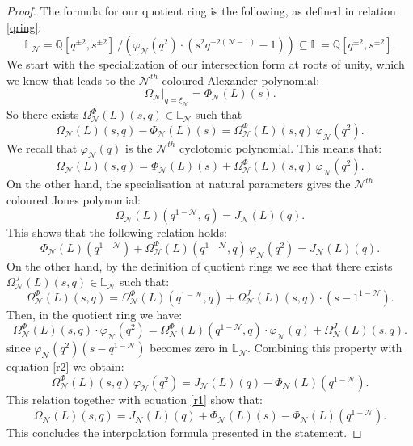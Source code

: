 \documentclass[reqno,a4paper,11pt]{amsart}
\numberwithin{equation}{section}
\numberwithin{figure}{section}
\theoremstyle{definition}
\theoremstyle{plain}
\newcommand{\Q}{\mathbb Q}
\newcommand{\Li}{{\mathbb L}}
\newcommand{\Liq}{\mathbb L}
\newcommand{\cN}{\mathcal{N}}
\begin{document}
\begin{proof}
The formula for our quotient ring is the following, as defined in relation \eqref{qring}:
%
\begin{equation*}
\Li_{\cN}=\Q[q^{\pm2}, s^{\pm 2}] \ / \left(\varphi_\cN(q^2)\cdot (s^2q^{-2(\cN-1)}-1)\right)
\subseteq \Liq=\Q[q^{\pm2}, s^{\pm 2}].
\end{equation*}
%
We start with the specialization of our intersection form at roots of unity, which we know that leads to the $\cN^{th}$ coloured Alexander polynomial:
$$\Omega_{\mathcal{N}}|_{q = \xi_{\mathcal{N}}} = \Phi_{\mathcal{N}}(L)(s).$$
 So there exists $\Omega_{\mathcal{N}}^\Phi(L)(s, q) \in \Li_{\cN}$ such that 
\begin{equation*}
\Omega_{\mathcal{N}}(L)(s, q) - \Phi_{\mathcal{N}}(L)(s) = 
\Omega_{\mathcal{N}}^\Phi(L)(s, q)\, \varphi_{\mathcal{N}}(q^2).
\end{equation*}
We recall that $\varphi_{\mathcal{N}}(q)$ is the $\cN^{th}$ cyclotomic polynomial.
This means that:
\begin{equation}\label{r1}
\Omega_{\mathcal{N}}(L)(s, q)= \Phi_{\mathcal{N}}(L)(s) + 
\Omega_{\mathcal{N}}^\Phi(L)(s,q)\, \varphi_{\mathcal{N}}(q^2).
\end{equation}
On the other hand, the specialisation at natural parameters gives the $\cN^{th}$ coloured Jones polynomial:
$$
\Omega_{\mathcal{N}}(L)(q^{1-\mathcal{N}},\, q) = J_{\mathcal{N}}(L)(q).
$$
This shows that the following relation holds:
\begin{equation}\label{r2}
 \Phi_{\mathcal{N}}(L)(q^{1-\cN}) + 
\Omega_{\mathcal{N}}^\Phi(L)(q^{1-\cN},q)\, \varphi_{\mathcal{N}}(q^2)=J_{\mathcal{N}}(L)(q).
\end{equation}
%
On the other hand, by the definition of quotient rings we see that there exists $\Omega_{\mathcal{N}}^J(L)(s, q) \in \Li_{\cN}$ such that:
\begin{equation*}%
\Omega_{\mathcal{N}}^\Phi(L)(s,q)=\Omega_{\mathcal{N}}^\Phi(L)(q^{1-\cN},q)+\Omega_{\mathcal{N}}^J(L)(s, q) \cdot(s-1^{1-\cN}).
\end{equation*}
Then, in the quotient ring we have:
\begin{equation*}
\Omega_{\mathcal{N}}^\Phi(L)(s,q) \cdot \varphi_{\mathcal{N}}(q^2)=\Omega_{\mathcal{N}}^\Phi(L)(q^{1-\cN},q) \cdot \varphi_{\mathcal{N}}(q)+ \Omega_{\mathcal{N}}^J(L)(s, q).
\end{equation*}
since $\varphi_{\mathcal{N}}(q^2)(s-q^{1-\cN})$ becomes zero in $\Li_{\cN}$.
%
%
Combining this property with equation \eqref{r2} we obtain:
\begin{equation*}
\Omega_{\mathcal{N}}^\Phi(L)(s,q)\, \varphi_{\mathcal{N}}(q^2)=J_{\mathcal{N}}(L)(q)- \Phi_{\mathcal{N}}(L)(q^{1-\cN}).
\end{equation*}
This relation together with equation \eqref{r1} show that:
\begin{equation*}
\Omega_{\mathcal{N}}(L)(s, q)
=J_{\mathcal{N}}(L)(q) +\Phi_{\mathcal{N}}(L)(s)- \Phi_{\mathcal{N}}(L)(q^{1-\mathcal{N}}).
\end{equation*}
%
This concludes the interpolation formula presented in the statement. 
%
\end{proof}
%
%
\end{document}
